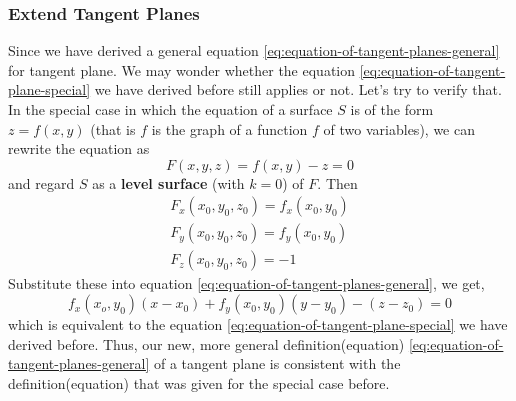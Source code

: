 \documentclass[math,code]{amznotes}
\theoremstyle{remark}
\begin{document}
\subsubsection{Extend Tangent Planes}
Since we have derived a general equation \eqref{eq:equation-of-tangent-planes-general} for tangent plane. We may wonder whether the equation \eqref{eq:equation-of-tangent-plane-special} we have derived before still applies or not. Let's try to verify that. \newline
In the special case in which the equation of a surface $S$ is of the form $z=f(x,y)$ (that is $f$ is the graph of a function $f$ of two variables), we can rewrite the equation as
\begin{displaymath}
    F(x,y,z)=f(x,y)-z=0
\end{displaymath}
and regard $S$ as a {\color{red} \textbf{level surface}} (with $k=0$) of $F$. Then
\begin{gather*}
    F_x(x_0,y_0,z_0)=f_x(x_0,y_0) \\
    F_y(x_0,y_0,z_0)=f_y(x_0,y_0) \\
    F_z(x_0,y_0,z_0)=-1 
\end{gather*}
Substitute these into equation \eqref{eq:equation-of-tangent-planes-general}, we get,
\begin{displaymath}
    f_x(x_o,y_0)(x-x_0)+f_y(x_0,y_0)(y-y_0)-(z-z_0)=0
\end{displaymath}
which is equivalent to the equation \eqref{eq:equation-of-tangent-plane-special} we have derived before. Thus, our new, more general definition(equation) \eqref{eq:equation-of-tangent-planes-general} of a tangent plane is consistent with the definition(equation) that was given for the special case before.
\end{document}
